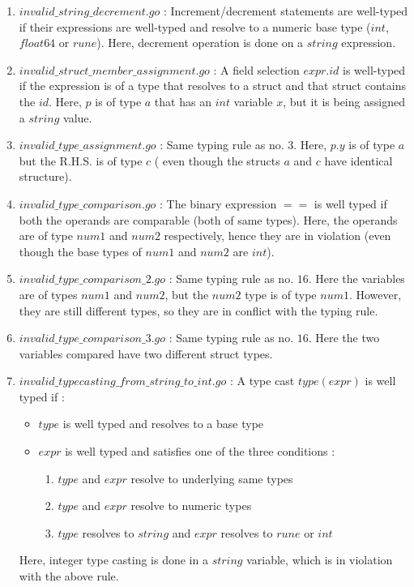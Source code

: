 \documentclass[preprint,12pt]{elsarticle}
\begin{document}
\begin{enumerate}
\item $invalid\_string\_decrement.go$ : Increment/decrement statements are well-typed if their expressions are well-typed and resolve to a numeric base type ($int$, $float64$ or $rune$). Here, decrement operation is done on a $string$ expression.

\item $invalid\_struct\_member\_assignment.go$ : A field selection $expr.id$ is well-typed if the expression is of a type that resolves to a struct and that struct contains the $id$. Here, $p$ is of type $a$ that has an $int$ variable $x$, but it is being assigned a $string$ value.

\item $invalid\_type\_assignment.go$ : Same typing rule as no. $3$. Here, $p.y$ is of type $a$ but the R.H.S. is of type $c$ ( even though the structs $a$ and $c$ have identical structure).

\item $invalid\_type\_comparison.go$ : The binary expression $==$ is well typed if both the operands are comparable (both of same types). Here, the operands are of type $num1$ and $num2$ respectively, hence they are in violation (even though the base types of $num1$ and $num2$ are $int$).

\item $invalid\_type\_comparison\_2.go$ : Same typing rule as no. $16$. Here the variables are of types $num1$ and $num2$, but the $num2$ type is of type $num1$. However, they are still different types, so they are in conflict with the typing rule.

\item $invalid\_type\_comparison\_3.go$ : Same typing rule as no. $16$. Here the two variables compared have two different struct types.

\item $invalid\_typecasting\_from\_string\_to\_int.go$ : A type cast $type(expr)$ is well typed if : 
\begin{itemize}
\item $type$ is well typed and resolves to a base type
\item $expr$ is well typed and satisfies one of the three conditions : 
\begin{enumerate}
\item $type$ and $expr$ resolve to underlying same types
\item $type$ and $expr$ resolve to numeric types
\item $type$ resolves to $string$ and $expr$ resolves to $rune$ or $int$
\end{enumerate}
\end{itemize}
Here, integer type casting is done in a $string$ variable, which is in violation with the above rule.


\end{enumerate}
\end{document}
